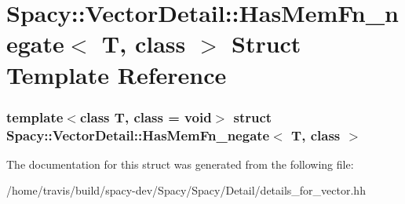 \hypertarget{structSpacy_1_1VectorDetail_1_1HasMemFn__negate}{\section{\-Spacy\-:\-:\-Vector\-Detail\-:\-:\-Has\-Mem\-Fn\-\_\-negate$<$ \-T, class $>$ \-Struct \-Template \-Reference}
\label{structSpacy_1_1VectorDetail_1_1HasMemFn__negate}
}
\subsubsection*{template$<$class T, class = void$>$ struct Spacy\-::\-Vector\-Detail\-::\-Has\-Mem\-Fn\-\_\-negate$<$ T, class $>$}



\-The documentation for this struct was generated from the following file\-:\begin{DoxyCompactItemize}
\item 
/home/travis/build/spacy-\/dev/\-Spacy/\-Spacy/\-Detail/details\-\_\-for\-\_\-vector.\-hh\end{DoxyCompactItemize}
